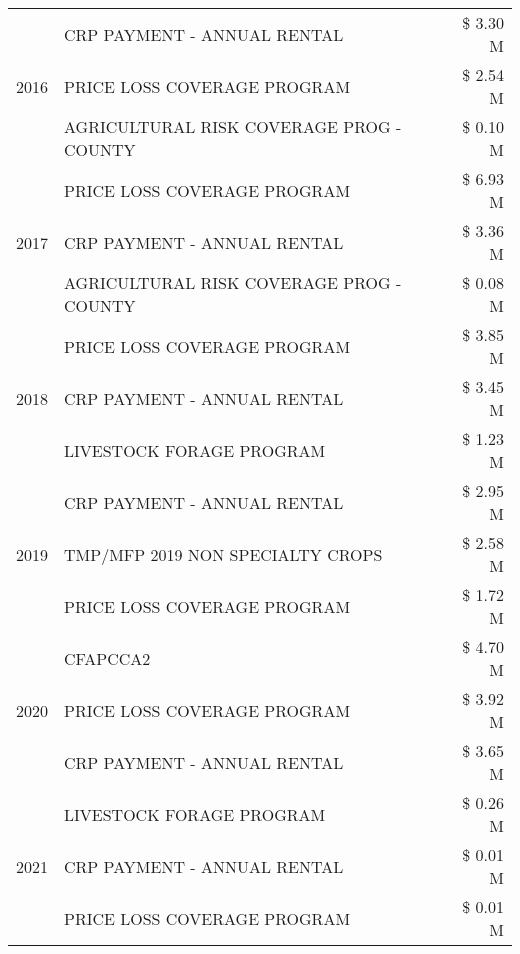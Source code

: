 \begin{tabular}{llr}
\cline{1-3}
\multirow[t]{3}{*}{2016} & CRP PAYMENT - ANNUAL RENTAL                   & \$ 3.30 M \\
 & PRICE LOSS COVERAGE PROGRAM                   & \$ 2.54 M \\
 & AGRICULTURAL RISK COVERAGE PROG - COUNTY      & \$ 0.10 M \\
\cline{1-3}
\multirow[t]{3}{*}{2017} & PRICE LOSS COVERAGE PROGRAM & \$ 6.93 M \\
 & CRP PAYMENT - ANNUAL RENTAL & \$ 3.36 M \\
 & AGRICULTURAL RISK COVERAGE PROG - COUNTY & \$ 0.08 M \\
\cline{1-3}
\multirow[t]{3}{*}{2018} & PRICE LOSS COVERAGE PROGRAM & \$ 3.85 M \\
 & CRP PAYMENT - ANNUAL RENTAL & \$ 3.45 M \\
 & LIVESTOCK FORAGE PROGRAM & \$ 1.23 M \\
\cline{1-3}
\multirow[t]{3}{*}{2019} & CRP PAYMENT - ANNUAL RENTAL & \$ 2.95 M \\
 & TMP/MFP 2019 NON SPECIALTY CROPS & \$ 2.58 M \\
 & PRICE LOSS COVERAGE PROGRAM & \$ 1.72 M \\
\cline{1-3}
\multirow[t]{3}{*}{2020} & CFAPCCA2 & \$ 4.70 M \\
 & PRICE LOSS COVERAGE PROGRAM & \$ 3.92 M \\
 & CRP PAYMENT - ANNUAL RENTAL & \$ 3.65 M \\
\cline{1-3}
\multirow[t]{3}{*}{2021} & LIVESTOCK FORAGE PROGRAM & \$ 0.26 M \\
 & CRP PAYMENT - ANNUAL RENTAL & \$ 0.01 M \\
 & PRICE LOSS COVERAGE PROGRAM & \$ 0.01 M \\
\cline{1-3}
\bottomrule
\end{tabular}
